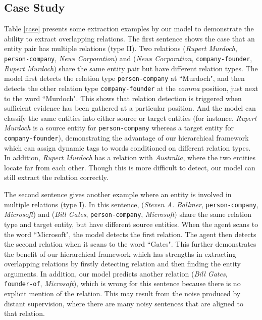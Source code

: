 \documentclass[letterpaper]{article} \usepackage{aaai19}  \usepackage{times}  \usepackage{helvet}  \usepackage{courier}  \usepackage{url}  \usepackage{graphicx}  \frenchspacing  \setlength{\pdfpagewidth}{8.5in}  \setlength{\pdfpageheight}{11in}  \usepackage{amsfonts}
\theoremstyle{definition}
\begin{document}
\subsection{Case Study}



Table \ref{case} presents some extraction examples by our model to demonstrate the ability to extract overlapping relations. The first sentence shows the case that an entity pair has multiple relations (type II). Two relations (\textit{Rupert Murdoch}, \texttt{person-company}, \textit{News Corporation}) and (\textit{News Corporation}, \texttt{company-founder}, \textit{Rupert Murdoch}) share the same entity pair but have different relation types. The model first detects the relation type \texttt{person-company} at ``Murdoch", and then detects the other relation type \texttt{company-founder} at the \textit{comma} position, just next to the word ``Murdoch". This shows that relation detection is triggered when sufficient evidence has been gathered at a particular position. 
And the model can classify the same entities into either source or target entities (for instance, \textit{Rupert Murdoch} is a source entity for \texttt{person-company} whereas a target entity for \texttt{company-founder}), demonstrating the advantage of our hierarchical framework which can assign dynamic tags to words conditioned on different relation types.
In addition, \textit{Rupert Murdoch} has a relation with \textit{Australia}, where the two entities locate far from each other. Though this is more difficult to detect, our model can still extract the relation correctly.

The second sentence gives another example where an entity is involved in multiple relations (type I). In this sentence, (\textit{Steven A. Ballmer}, \texttt{person-company}, \textit{Microsoft}) and (\textit{Bill Gates}, \texttt{person-company}, \textit{Microsoft}) share the same relation type and target entity, but have different source entities. When the agent scans to the word ``Microsoft", the model detects the first relation. The agent then detects the second relation when it scans to the word ``Gates". This further demonstrates the benefit of our hierarchical framework which has strengths in extracting overlapping relations by firstly detecting relation and then finding the entity arguments. 
In addition, our model predicts another relation (\textit{Bill Gates}, \texttt{founder-of}, \textit{Microsoft}), which is wrong for this sentence because there is no explicit mention of the relation. This may result from the noise produced by distant supervision, where there are many noisy sentences that are aligned to that relation.
\end{document}

